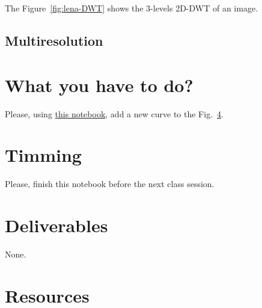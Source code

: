 The Figure~\ref{fig:lena-DWT} shows the $3$-levels 2D-DWT of an image.

\subsection{Multiresolution}

\section{What you have to do?}
  
Please, using \href{}{this notebook}, add a new curve to the Fig.~\ref{}.

\section{Timming}

Please, finish this notebook before the next class session.

\section{Deliverables}

None.

\section{Resources}


